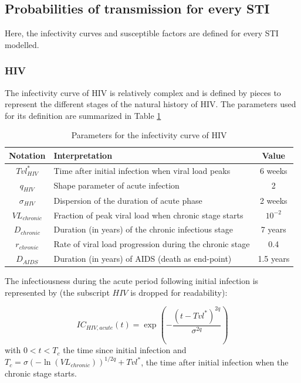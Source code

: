 \documentclass[11pt, onecolumn]{article}
\begin{document}
\subsection{Probabilities of transmission for every STI}
\label{sec:probaTransmission}
Here, the infectivity curves and susceptible factors are defined for every STI modelled.

\subsubsection{HIV}
The infectivity curve of HIV is relatively complex and is defined by pieces to represent the different stages of the natural history of HIV. The parameters used for its definition are summarized in Table \ref{table:ICHIV}

\begin{table}[htdp]
\caption{Parameters for the infectivity curve of HIV}
\begin{center}
\begin{tabular}{clc}
\hline
\textbf{Notation} & \textbf{Interpretation} & \textbf{Value} \\
\hline
\hline
$Tvl^*_{HIV}$ & Time after initial infection when viral load peaks & 6 weeks\\
$q_{HIV}$ & Shape parameter of acute infection & 2 \\
$\sigma_{HIV}$ & Dispersion of the duration of acute phase & 2 weeks \\
$VL_{chronic}$ & Fraction of peak viral load when chronic stage starts  & $10^{-2}$ \\
$D_{chronic}$ & Duration (in years) of the chronic infectious stage & 7 years \\
$r_{chronic}$ & Rate of viral load progression during the chronic stage & 0.4 \\
$D_{AIDS}$ & Duration (in years) of AIDS (death as end-point) & 1.5 years \\
\hline
\end{tabular}
\end{center}
\label{table:ICHIV}
\end{table}

The infectiousness during the acute period following initial infection is represented by (the subscript $HIV$ is dropped for readability):

$$IC_{HIV,acute}(t) = \exp\left( -\frac{(t-Tvl^*)^{2q}}{\sigma^{2q}} \right)$$
with $ 0<t<T_c$ the time since initial infection and $T_c = \sigma (-\ln(VL_{chronic}))^{1/2q} + Tvl^*$, the time after initial infection when the chronic stage starts.
\end{document}
